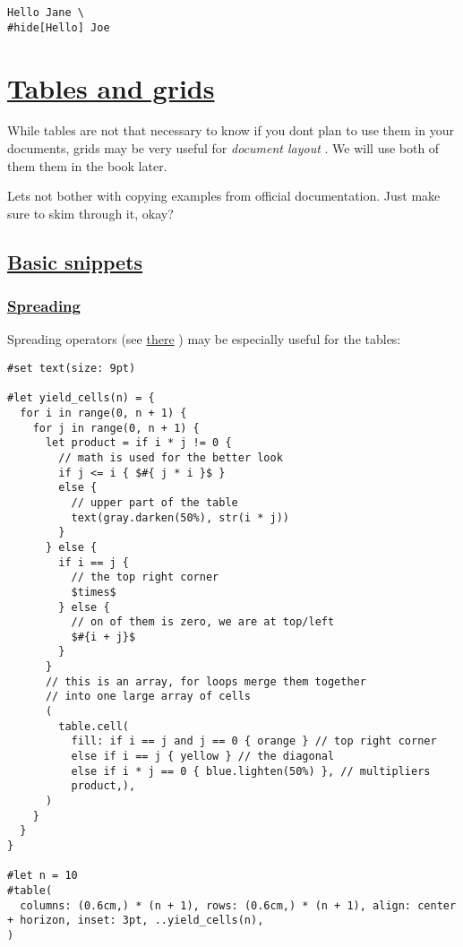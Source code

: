 \begin{verbatim}
Hello Jane \
#hide[Hello] Joe
\end{verbatim}

\pandocbounded{}

\section{\texorpdfstring{\hyperref[tables-and-grids]{Tables and
grids}}{Tables and grids}}\label{tables-and-grids}

While tables are not that necessary to know if you don\textquotesingle t
plan to use them in your documents, grids may be very useful for
\emph{document layout} . We will use both of them them in the book
later.

Let\textquotesingle s not bother with copying examples from official
documentation. Just make sure to skim through it, okay?

\subsection{\texorpdfstring{\hyperref[basic-snippets]{Basic
snippets}}{Basic snippets}}\label{basic-snippets}

\subsubsection{\texorpdfstring{\hyperref[spreading]{Spreading}}{Spreading}}\label{spreading}

Spreading operators (see
\href{basics/must_know/../scripting/arguments.html}{there} ) may be
especially useful for the tables:

\begin{verbatim}
#set text(size: 9pt)

#let yield_cells(n) = {
  for i in range(0, n + 1) {
    for j in range(0, n + 1) {
      let product = if i * j != 0 {
        // math is used for the better look 
        if j <= i { $#{ j * i }$ } 
        else {
          // upper part of the table
          text(gray.darken(50%), str(i * j))
        }
      } else {
        if i == j {
          // the top right corner 
          $times$
        } else {
          // on of them is zero, we are at top/left
          $#{i + j}$
        }
      }
      // this is an array, for loops merge them together
      // into one large array of cells
      (
        table.cell(
          fill: if i == j and j == 0 { orange } // top right corner
          else if i == j { yellow } // the diagonal
          else if i * j == 0 { blue.lighten(50%) }, // multipliers
          product,),
      )
    }
  }
}

#let n = 10
#table(
  columns: (0.6cm,) * (n + 1), rows: (0.6cm,) * (n + 1), align: center + horizon, inset: 3pt, ..yield_cells(n),
)
\end{verbatim}

